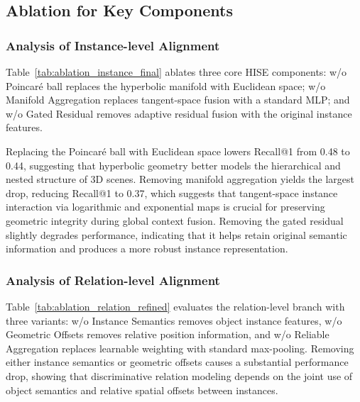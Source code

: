 \documentclass{article}
\begin{document}
\subsection{Ablation for Key Components}
\subsubsection{Analysis of Instance-level Alignment}
Table~\ref{tab:ablation_instance_final} ablates three core HISE components: w/o Poincaré ball replaces the hyperbolic manifold with Euclidean space; w/o Manifold Aggregation replaces tangent-space fusion with a standard MLP; and w/o Gated Residual removes adaptive residual fusion with the original instance features.

Replacing the Poincaré ball with Euclidean space lowers Recall@1 from 0.48 to 0.44, suggesting that hyperbolic geometry better models the hierarchical and nested structure of 3D scenes. Removing manifold aggregation yields the largest drop, reducing Recall@1 to 0.37, which suggests that tangent-space instance interaction via logarithmic and exponential maps is crucial for preserving geometric integrity during global context fusion. Removing the gated residual slightly degrades performance, indicating that it helps retain original semantic information and produces a more robust instance representation.
\subsubsection{Analysis of Relation-level Alignment}
Table~\ref{tab:ablation_relation_refined} evaluates the relation-level branch with three variants: w/o Instance Semantics removes object instance features, w/o Geometric Offsets removes relative position information, and w/o Reliable Aggregation replaces learnable weighting with standard max-pooling. Removing either instance semantics or geometric offsets causes a substantial performance drop, showing that discriminative relation modeling depends on the joint use of object semantics and relative spatial offsets between instances.
\end{document}
